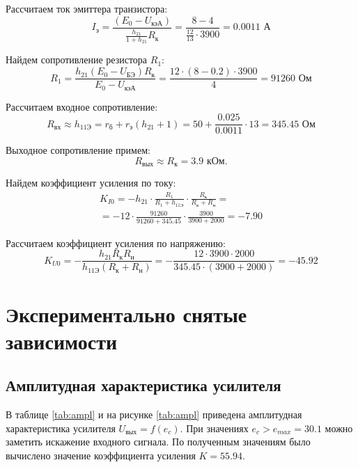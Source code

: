 \documentclass[a4paper,14pt]{extarticle}
\begin{document}
Рассчитаем ток эмиттера транзистора: 
\[
I_\text{э} = \frac{(E_0 - U_\text{кэА})}{\frac{h_{21}}{1+h_{21}}R_\text{к}} = \frac{8 - 4}{\frac{12}{13} \cdot 3900} = 0.0011 \text{ А}
\]

Найдем сопротивление резистора $R_1$:
\[
R_1 = \frac{h_{21}(E_0-U_\text{БЭ})R_\text{к}}{E_0-U_\text{кэА}} = \frac{12 \cdot (8 - 0.2) \cdot 3900}{4} = 91260 \text{ Ом}
\]

Рассчитаем входное сопротивление:
\begin{equation}\label{eq:r_in}
R_\text{вх} \approx h_\text{11Э} = r_\text{б} + r_\text{э}(h_{21} + 1) = 50 + \frac{0.025}{0.0011} \cdot 13 = 345.45 \text{ Ом}
\end{equation}

Выходное сопротивление примем:
\begin{equation}
R_\text{вых} \approx R_\text{к} = 3.9 \text{ кОм}.
\end{equation}

Найдем коэффициент усиления по току:
\begin{multline}
K_{I0} = - h_{21} \cdot \frac{R_1}{R_1 + h_\text{11Э}} \cdot \frac{R_\text{к}}{R_\text{к} + R_\text{н}} =\\= - 12 \cdot \frac{91260}{91260 + 345.45} \cdot \frac{3900}{3900 + 2000} = - 7.90
\end{multline}

Рассчитаем коэффициент усиления по напряжению:
\begin{equation}\label{eq:k_u0}
K_{U0} = -\frac{h_{21} R_\text{к} R_\text{н}}{h_\text{11Э}(R_\text{к} + R_\text{н})} = -\frac{12 \cdot 3900 \cdot 2000}{345.45 \cdot (3900 + 2000)} = -45.92
\end{equation}

\newpage

\section{Экспериментально снятые зависимости}

\subsection{Амплитудная характеристика усилителя}

В таблице \ref{tab:ampl} и на рисунке \ref{tab:ampl} приведена амплитудная характеристика усилителя $U_\text{вых} = f(e_c)$. При значениях $e_c > e_{max} = 30.1$ можно заметить искажение входного сигнала. По полученным значениям было вычислено значение коэффициента усиления $K = 55.94$.
\end{document}
